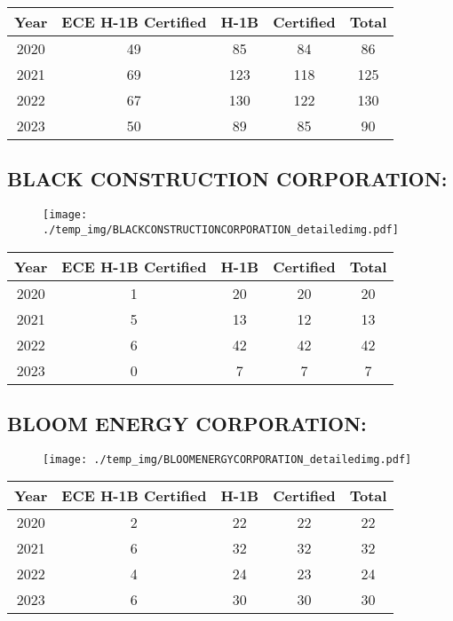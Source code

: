 \documentclass{article}%
\begin{document}
%
\begin{longtable}{c|c|c|c|c}%
\hline%
Year&ECE H{-}1B Certified&H{-}1B&Certified&Total\\%
\hline%
2020&49&85&84&86\\%
\hline%
2021&69&123&118&125\\%
\hline%
2022&67&130&122&130\\%
\hline%
2023&50&89&85&90\\%
\hline%
\end{longtable}

%
\newpage%
\subsection{BLACK CONSTRUCTION CORPORATION:}%
\label{subsec:BLACKCONSTRUCTIONCORPORATION}%
\label{BLACKCONSTRUCTIONCORPORATIONdetailed}%


\begin{figure}[htbp]%
\centering%
\texttt{[image: ./temp\_img/BLACKCONSTRUCTIONCORPORATION\_detailedimg.pdf]}%
\end{figure}

%
\begin{longtable}{c|c|c|c|c}%
\hline%
Year&ECE H{-}1B Certified&H{-}1B&Certified&Total\\%
\hline%
2020&1&20&20&20\\%
\hline%
2021&5&13&12&13\\%
\hline%
2022&6&42&42&42\\%
\hline%
2023&0&7&7&7\\%
\hline%
\end{longtable}

%
\newpage%
\subsection{BLOOM ENERGY CORPORATION:}%
\label{subsec:BLOOMENERGYCORPORATION}%
\label{BLOOMENERGYCORPORATIONdetailed}%


\begin{figure}[htbp]%
\centering%
\texttt{[image: ./temp\_img/BLOOMENERGYCORPORATION\_detailedimg.pdf]}%
\end{figure}

%
\begin{longtable}{c|c|c|c|c}%
\hline%
Year&ECE H{-}1B Certified&H{-}1B&Certified&Total\\%
\hline%
2020&2&22&22&22\\%
\hline%
2021&6&32&32&32\\%
\hline%
2022&4&24&23&24\\%
\hline%
2023&6&30&30&30\\%
\hline%
\end{longtable}
\end{document}
